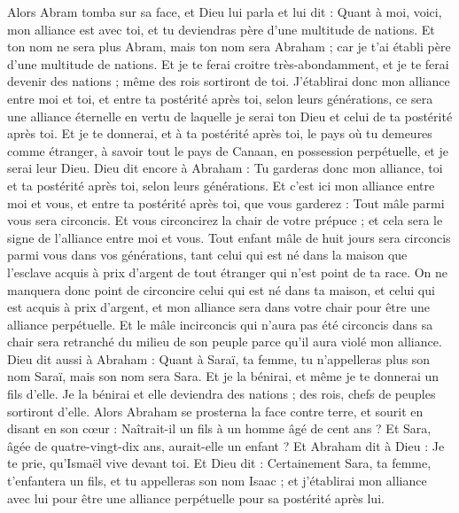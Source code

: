 \begin{multicols}{2}
Alors Abram tomba sur sa face, et Dieu lui parla et lui dit :
Quant à moi, voici, mon alliance est avec toi, et tu deviendras père d'une multitude de nations.
Et ton nom ne sera plus Abram, mais ton nom sera Abraham ; car je t'ai établi père d'une multitude de nations.
Et je te ferai croitre très-abondamment, et je te ferai devenir des nations ; même des rois sortiront de toi.
J'établirai donc mon alliance entre moi et toi, et entre ta postérité après toi, selon leurs générations, ce sera une alliance éternelle en vertu de laquelle je serai ton Dieu et celui de ta postérité après toi.
Et je te donnerai, et à ta postérité après toi, le pays où tu demeures comme étranger, à savoir tout le pays de Canaan, en possession perpétuelle, et je serai leur Dieu.
Dieu dit encore à Abraham : Tu garderas donc mon alliance, toi et ta postérité après toi, selon leurs générations.
Et c'est ici mon alliance entre moi et vous, et entre ta postérité après toi, que vous garderez : Tout mâle parmi vous sera circoncis.
Et vous circoncirez la chair de votre prépuce ; et cela sera le signe de l'alliance entre moi et vous.
Tout enfant mâle de huit jours sera circoncis parmi vous dans vos générations, tant celui qui est né dans la maison que l'esclave acquis à prix d'argent de tout étranger qui n'est point de ta race.
On ne manquera donc point de circoncire celui qui est né dans ta maison, et celui qui est acquis à prix d'argent, et mon alliance sera dans votre chair pour être une alliance perpétuelle.
Et le mâle incirconcis qui n'aura pas été circoncis dans sa chair sera retranché du milieu de son peuple parce qu'il aura violé mon alliance.
Dieu dit aussi à Abraham : Quant à Saraï, ta femme, tu n'appelleras plus son nom Saraï, mais son nom sera Sara.
Et je la bénirai, et même je te donnerai un fils d'elle. Je la bénirai et elle deviendra des nations ; des rois, chefs de peuples sortiront d'elle.
Alors Abraham se prosterna la face contre terre, et sourit en disant en son cœur : Naîtrait-il un fils à un homme âgé de cent ans ? Et Sara, âgée de quatre-vingt-dix ans, aurait-elle un enfant ?
Et Abraham dit à Dieu : Je te prie, qu'Ismaël vive devant toi.
Et Dieu dit : Certainement Sara, ta femme, t'enfantera un fils, et tu appelleras son nom Isaac ; et j'établirai mon alliance avec lui pour être une alliance perpétuelle pour sa postérité après lui.

\end{multicols}
